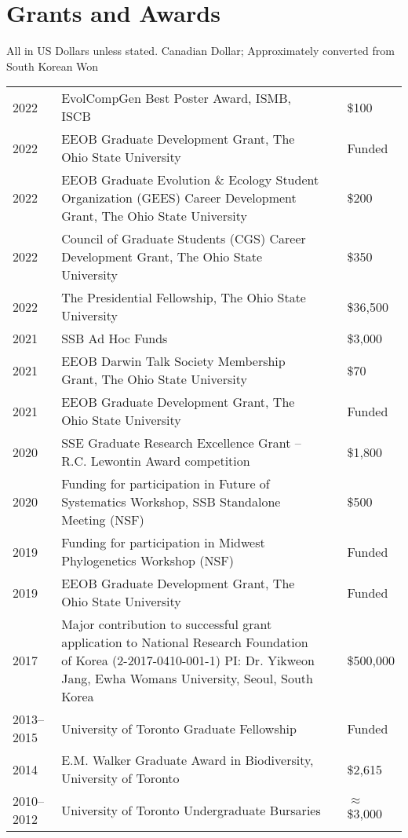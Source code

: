 \documentclass[11pt]{article}
\begin{document}
\hspace{0pt}


\section*{Grants and Awards}
All in US Dollars unless stated. \dag Canadian Dollar; \ddag Approximately converted from South Korean Won 

\begin{longtable}{p{}  p{} p{} p{} }%
2022 &	EvolCompGen Best Poster Award, ISMB, ISCB	& & \$100\\
2022 &	EEOB Graduate Development Grant, The Ohio State University	& & Funded\\
2022 &	EEOB Graduate Evolution \& Ecology Student Organization (GEES) Career Development Grant, The Ohio State University & & \$200\\
2022 & 	Council of Graduate Students (CGS) Career Development Grant, The Ohio State University & & \$350\\
2022 &	The Presidential Fellowship, The Ohio State University & & \$36,500\\
2021 &	SSB Ad Hoc Funds	& & \$3,000\\
2021 &	EEOB Darwin Talk Society Membership Grant, The Ohio State University	& & \$70\\
2021 &	EEOB Graduate Development Grant, The Ohio State University	& & Funded\\
2020 &	SSE Graduate Research Excellence Grant – R.C. Lewontin Award competition	& & \$1,800 \\
2020 &	Funding for participation in Future of Systematics Workshop, SSB Standalone Meeting (NSF)	& & \$500\\
2019 &	Funding for participation in Midwest Phylogenetics Workshop (NSF)	& & Funded\\
2019 &	EEOB Graduate Development Grant, The Ohio State University	& & Funded\\
2017 &	Major contribution to successful grant application to 	National Research Foundation of Korea (2-2017-0410-001-1) PI: Dr. Yikweon Jang, Ewha Womans University, Seoul, South Korea	& & \ddag\$500,000\\
2013--2015 & University of Toronto Graduate Fellowship	& & Funded\\
2014 &	E.M. Walker Graduate Award in Biodiversity, University of Toronto	& & \dag\$2,615 \\
2010--2012 &	University of Toronto Undergraduate Bursaries	& & \dag$\approx$\$3,000 \\

\end{longtable}
\end{document}
